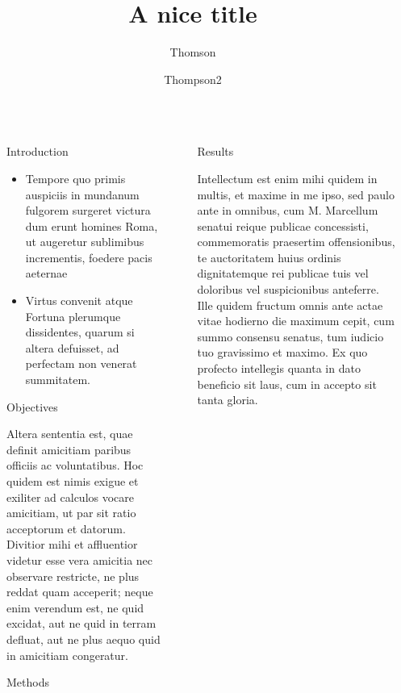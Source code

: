 \documentclass[final]{beamer}
\title{A nice title}
\author{Thomson\inst{1} \and Thompson{2}}
\institute[shortinst]{\inst{1} Some Institute \samelineand \inst{2} Another Institute}
\newlength{\sepwidth}
\newlength{\colwidth}
\newcommand{\separatorcolumn}{\begin{column}{\sepwidth}\end{column}}
\begin{document}
\begin{frame}[t]
\begin{columns}[t]
\separatorcolumn

\begin{column}{\colwidth}

\begin{block}{Introduction}

\begin{itemize}
    \item Tempore quo primis auspiciis in mundanum fulgorem surgeret victura dum erunt homines Roma, ut augeretur sublimibus incrementis, foedere pacis aeternae
	\item Virtus convenit atque Fortuna plerumque dissidentes, quarum si altera defuisset, ad perfectam non venerat summitatem.
\end{itemize}

\end{block}
  
\begin{alertblock}{Objectives}

Altera sententia est, quae definit amicitiam paribus officiis ac voluntatibus.
Hoc quidem est nimis exigue et exiliter ad calculos vocare amicitiam, ut par sit ratio acceptorum et datorum.
Divitior mihi et affluentior videtur esse vera amicitia nec observare restricte, ne plus reddat quam acceperit; neque enim verendum est, ne quid excidat, aut ne quid in terram defluat, aut ne plus aequo quid in amicitiam congeratur.

\end{alertblock}

\begin{block}{Methods}



\end{block}

\end{column}

\separatorcolumn

\begin{column}{\colwidth}

\begin{block}{Results}

Intellectum est enim mihi quidem in multis, et maxime in me ipso, sed paulo ante in omnibus, cum M. Marcellum senatui reique publicae concessisti, commemoratis praesertim offensionibus, te auctoritatem huius ordinis dignitatemque rei publicae tuis vel doloribus vel suspicionibus anteferre.
Ille quidem fructum omnis ante actae vitae hodierno die maximum cepit, cum summo consensu senatus, tum iudicio tuo gravissimo et maximo.
Ex quo profecto intellegis quanta in dato beneficio sit laus, cum in accepto sit tanta gloria.


\end{block}
\end{column}
\end{columns}
\end{frame}
\end{document}
